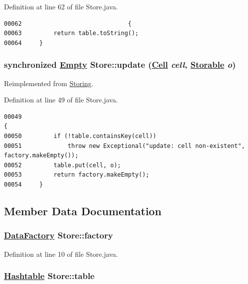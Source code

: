 Definition at line 62 of file Store.java.\footnotesize\begin{verbatim}00062                              {
00063         return table.toString();
00064     }
\end{verbatim}\normalsize 
\hypertarget{classStore_a2}{
\subsubsection[update]{\setlength{\rightskip}{0pt plus 5cm}synchronized \hyperlink{interfaceEmpty}{Empty} Store::update (\hyperlink{interfaceCell}{Cell} {\em cell}, \hyperlink{interfaceStorable}{Storable} {\em o})}}
\label{classStore_a2}




Reimplemented from \hyperlink{interfaceStoring_a2}{Storing}.

Definition at line 49 of file Store.java.\footnotesize\begin{verbatim}00049                                                                                {
00050         if (!table.containsKey(cell)) 
00051             throw new Exceptional("update: cell non-existent", factory.makeEmpty());
00052         table.put(cell, o);
00053         return factory.makeEmpty();
00054     }
\end{verbatim}\normalsize 


\subsection{Member Data Documentation}
\hypertarget{classStore_o0}{
\subsubsection[factory]{\setlength{\rightskip}{0pt plus 5cm}\hyperlink{interfaceDataFactory}{Data\-Factory} Store::factory}}
\label{classStore_o0}




Definition at line 10 of file Store.java.\hypertarget{classStore_o1}{
\subsubsection[table]{\setlength{\rightskip}{0pt plus 5cm}\hyperlink{classHashtable}{Hashtable} Store::table}}
\label{classStore_o1}




